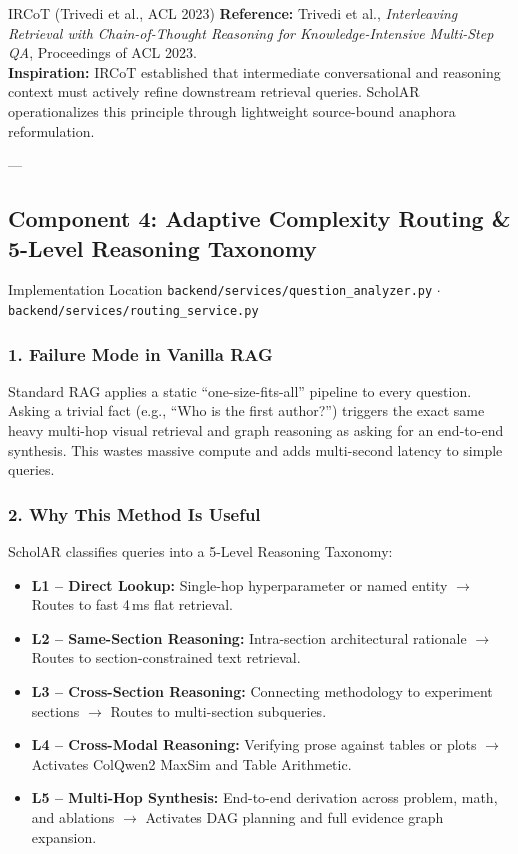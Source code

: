\documentclass[11pt,a4paper]{article}
\begin{document}
\begin{inspirationbox}{IRCoT (Trivedi et al., ACL 2023)}
\textbf{Reference:} Trivedi et al., \emph{Interleaving Retrieval with Chain-of-Thought Reasoning for Knowledge-Intensive Multi-Step QA}, Proceedings of ACL 2023.\\
\textbf{Inspiration:} IRCoT established that intermediate conversational and reasoning context must actively refine downstream retrieval queries. ScholAR operationalizes this principle through lightweight source-bound anaphora reformulation.
\end{inspirationbox}

---

\subsection{Component 4: Adaptive Complexity Routing \& 5-Level Reasoning Taxonomy}
\begin{codebox}{Implementation Location}
\texttt{backend/services/question\_analyzer.py} $\cdot$ \texttt{backend/services/routing\_service.py}
\end{codebox}

\subsubsection{1. Failure Mode in Vanilla RAG}
Standard RAG applies a static ``one-size-fits-all'' pipeline to every question. Asking a trivial fact (e.g., ``Who is the first author?'') triggers the exact same heavy multi-hop visual retrieval and graph reasoning as asking for an end-to-end synthesis. This wastes massive compute and adds multi-second latency to simple queries.

\subsubsection{2. Why This Method Is Useful}
ScholAR classifies queries into a 5-Level Reasoning Taxonomy:
\begin{itemize}[leftmargin=*]
    \item \textbf{L1 -- Direct Lookup:} Single-hop hyperparameter or named entity $\rightarrow$ Routes to fast 4\,ms flat retrieval.
    \item \textbf{L2 -- Same-Section Reasoning:} Intra-section architectural rationale $\rightarrow$ Routes to section-constrained text retrieval.
    \item \textbf{L3 -- Cross-Section Reasoning:} Connecting methodology to experiment sections $\rightarrow$ Routes to multi-section subqueries.
    \item \textbf{L4 -- Cross-Modal Reasoning:} Verifying prose against tables or plots $\rightarrow$ Activates ColQwen2 MaxSim and Table Arithmetic.
    \item \textbf{L5 -- Multi-Hop Synthesis:} End-to-end derivation across problem, math, and ablations $\rightarrow$ Activates DAG planning and full evidence graph expansion.
\end{itemize}
\end{document}
